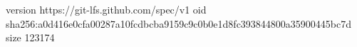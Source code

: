 version https://git-lfs.github.com/spec/v1
oid sha256:a0d416e0cfa00287a10fcdbcba9159c9c0b0e1d8fc393844800a35900445bc7d
size 123174
